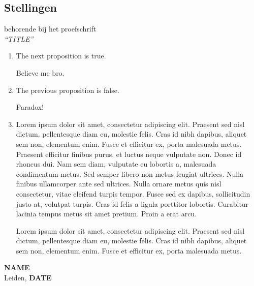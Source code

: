 \documentclass[10pt]{article}
\newenvironment{answer}{}{}
\begin{document}
\thispagestyle{empty}
\begin{spacing}{1.1}
\centering 
\section*{\LARGE{Stellingen}}
behorende bij het proefschrift \\
\emph{``TITLE''} \\
\end{spacing}

\begin{enumerate}[label=(\roman*),leftmargin=0pt]
\item The next proposition is true.
\begin{answer}

Believe me bro.
\end{answer}
\item The previous proposition is false.
\begin{answer}

Paradox!
\end{answer}
\item Lorem ipsum dolor sit amet, consectetur adipiscing elit. Praesent sed nisl dictum, pellentesque diam eu, molestie felis. Cras id nibh dapibus, aliquet sem non, elementum enim. Fusce et efficitur ex, porta malesuada metus. Praesent efficitur finibus purus, et luctus neque vulputate non. Donec id rhoncus dui. Nam sem diam, vulputate eu lobortis a, malesuada condimentum metus. Sed semper libero non metus feugiat ultrices. Nulla finibus ullamcorper ante sed ultrices. Nulla ornare metus quis nisl consectetur, vitae eleifend turpis tempor. Fusce sed ex dapibus, sollicitudin justo at, volutpat turpis. Cras id felis a ligula porttitor lobortis. Curabitur lacinia tempus metus sit amet pretium. Proin a erat arcu.
\begin{answer}

Lorem ipsum dolor sit amet, consectetur adipiscing elit. Praesent sed nisl dictum, pellentesque diam eu, molestie felis. Cras id nibh dapibus, aliquet sem non, elementum enim. Fusce et efficitur ex, porta malesuada metus.
\end{answer}
\end{enumerate}

\vfill
\setlength{\leftskip}{6.5cm}
\noindent \textbf{NAME}\\
Leiden, \textbf{DATE}
\end{document}
